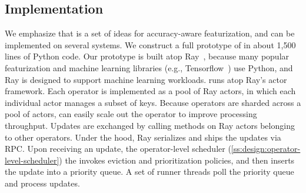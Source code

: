 
%
\subsection{Implementation}
\label{ss:design:implementation}
%
%
We emphasize that \system{} is a set of ideas for accuracy-aware featurization, and
can be implemented on several systems.
%
We construct a full prototype of \system{} in about 1,500 lines of Python code.
%
Our prototype is built atop Ray~\cite{ray}, because many
popular featurization and machine learning libraries (e.g., Tensorflow~\cite{tensorflow})
use Python, and Ray is designed to support machine learning workloads.
%
%
%
%
\system{} runs atop Ray's actor framework.
%
Each operator is implemented as a pool of Ray actors, in which each
individual actor manages a subset of keys.
%
Because operators are sharded across a pool of actors, \system{} can easily
scale out the operator to improve processing throughput.
%
Updates are exchanged by calling methods on Ray actors belonging to other operators.
%
Under the hood, Ray serializes and ships the updates via RPC.
%
Upon receiving an update, the operator-level scheduler
(\cref{ss:design:operator-level-scheduler})
the invokes eviction and prioritization policies, and then inserts the update
into a priority queue.
%
A set of runner threads poll the priority queue and process updates.
%
%
%

